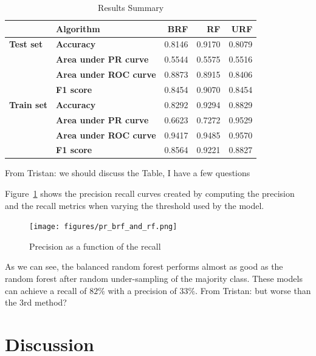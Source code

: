 \documentclass[conference]{IEEEtran}
\newcommand{\TG}[1]{\colorlet{saved}{.}\color{orange}From Tristan: #1\color{saved}}
\begin{document}
\begin{table}[htbp]
\caption{Results Summary}
\begin{center}
\begin{tabular}{|l|l|r|r|r|}
\hline
          & \textbf{Algorithm} &     BRF &      RF &     URF \\
\hline
\textbf{Test set} & \textbf{Accuracy} &  0.8146 &  0.9170 &  0.8079 \\
          & \textbf{Area under PR curve} &  0.5544 &  0.5575 &  0.5516 \\
          & \textbf{Area under ROC curve} &  0.8873 &  0.8915 &  0.8406 \\
          & \textbf{F1 score} &  0.8454 &  0.9070 &  0.8454 \\
\hline
\textbf{Train set} & \textbf{Accuracy} &  0.8292 &  0.9294 &  0.8829 \\
          & \textbf{Area under PR curve} &  0.6623 &  0.7272 &  0.9529 \\
          & \textbf{Area under ROC curve} &  0.9417 &  0.9485 &  0.9570 \\
          & \textbf{F1 score} &  0.8564 &  0.9221 &  0.8827 \\
\hline
\end{tabular}
\label{table:summary}
\end{center}
\end{table}

\TG{we should discuss the Table, I have a few questions}

Figure~\ref{fig:precision-recall} shows the precision recall curves created
by computing the precision and the recall metrics when varying the
threshold used by the model.

\begin{figure}[htbp]
\centerline{\texttt{[image: figures/pr\_brf\_and\_rf.png]}}
\caption{Precision as a function of the recall}
\label{fig:precision-recall}
\end{figure}

As we can see, the balanced random forest performs almost as good as the
random forest after random under-sampling of the majority class. These
models can achieve a recall of $82\%$ with a precision of $33\%$.
\TG{but worse than the 3rd method?}

\section{Discussion}
\end{document}
